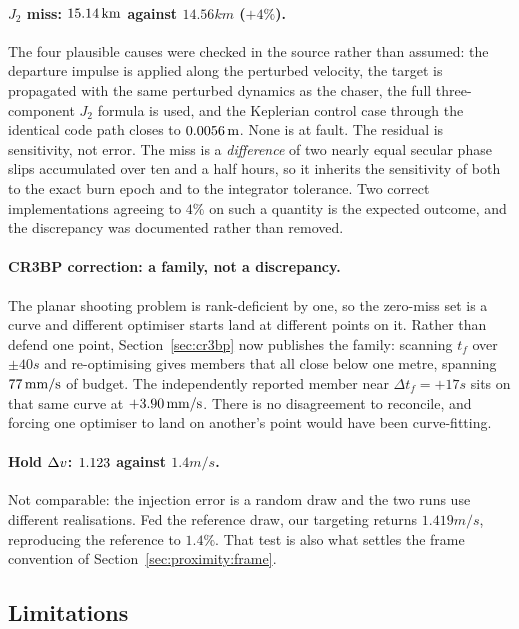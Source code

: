 \paragraph{$J_2$ miss: $15.14\,\mathrm{km}$ against $14.56\unit{km}$ ($+4\%$).}
The four plausible causes were checked in the source rather than assumed: the
departure impulse is applied along the perturbed velocity, the target is
propagated with the same perturbed dynamics as the chaser, the full
three-component $J_2$ formula is used, and the Keplerian control case through
the identical code path closes to $0.0056\,\mathrm{m}$. None is at fault.
The residual is sensitivity, not error. The miss is a \emph{difference} of two
nearly equal secular phase slips accumulated over ten and a half hours, so it
inherits the sensitivity of both to the exact burn epoch and to the integrator
tolerance. Two correct implementations agreeing to $4\%$ on such a quantity is
the expected outcome, and the discrepancy was documented rather than removed.

\paragraph{CR3BP correction: a family, not a discrepancy.}
The planar shooting problem is rank-deficient by one, so the zero-miss set is a
curve and different optimiser starts land at different points on it. Rather than
defend one point, Section~\ref{sec:cr3bp} now publishes the family: scanning
$t_f$ over $\pm40\unit{s}$ and re-optimising gives \mFamN{} members that all
close below one metre, spanning $77\,\mathrm{mm/s}$ of budget. The
independently reported member near $\Delta t_f = +17\unit{s}$ sits on that same
curve at $+3.90\,\mathrm{mm/s}$. There is no disagreement to reconcile, and
forcing one optimiser to land on another's point would have been curve-fitting.

\paragraph{Hold $\Delta v$: $1.123$ against $1.4\unit{m/s}$.}
Not comparable: the injection error is a random draw and the two runs use
different realisations. Fed the reference draw, our targeting returns
$1.419\unit{m/s}$, reproducing the reference to $1.4\%$. That test is also what
settles the frame convention of Section~\ref{sec:proximity:frame}.

\subsection{Limitations}
\label{sec:limits}

